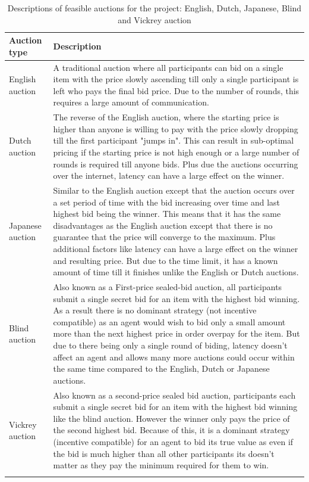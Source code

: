 \begin{longtable}{|p{3.5cm}|p{11cm}|} \hline
    \textbf{Auction type} & \textbf{Description} \\ \hline
    English auction & A traditional auction where all participants can bid on a single item with the price slowly
        ascending till only a single participant is left who pays the final bid price. Due to the number of rounds,
        this requires a large amount of communication. \\ \hline

    Dutch auction & The reverse of the English auction, where the starting price is higher than anyone is willing to
        pay with the price slowly dropping till the first participant "jumps in". This can result in sub-optimal pricing
        if the starting price is not high enough or a large number of rounds is required till anyone bids. Plus due
        the auctions occurring over the internet, latency can have a large effect on the winner. \\ \hline

    Japanese auction & Similar to the English auction except that the auction occurs over a set period of time with the
        bid increasing over time and last highest bid being the winner. This means that it has the same disadvantages
        as the English auction except that there is no guarantee that the price will converge to the maximum. Plus
        additional factors like latency can have a large effect on the winner and resulting price. But due to the time
        limit, it has a known amount of time till it finishes unlike the English or Dutch auctions. \\ \hline

    Blind auction & Also known as a First-price sealed-bid auction, all participants submit a single secret bid for an
        item with the highest bid winning. As a result there is no dominant strategy (not incentive compatible) as an
        agent would wish to bid only a small amount more than the next highest price in order overpay for the item.
        But due to there being only a single round of biding, latency doesn't affect an agent and allows many
        more auctions could occur within the same time compared to the English, Dutch or Japanese auctions. \\ \hline

    Vickrey auction~\citep{vickrey} & Also known as a second-price sealed bid auction, participants each submit
        a single secret bid for an item with the highest bid winning like the blind auction. However the winner only
        pays the price of the second highest bid. Because of this, it is a dominant strategy (incentive compatible)
        for an agent to bid its true value as even if the bid is much higher than all other participants its doesn't
        matter as they pay the minimum required for them to win. \\ \hline
    \caption{Descriptions of feasible auctions for the project: English, Dutch, Japanese, Blind and Vickrey auction}
    \label{tab:auctions_descriptions}
\end{longtable}

